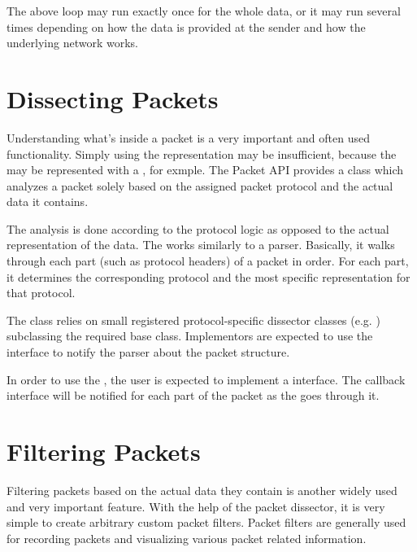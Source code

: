 
The above loop may run exactly once for the whole data, or it may run several
times depending on how the data is provided at the sender and how the underlying
network works.

\section{Dissecting Packets}

Understanding what's inside a packet is a very important and often used
functionality. Simply using the representation may be insufficient, because the
 may be represented with a , for exmple.
The Packet API provides a  class which analyzes a
packet solely based on the assigned packet protocol and the actual data it
contains.

The analysis is done according to the protocol logic as opposed to the actual
representation of the data. The  works similarly to a
parser. Basically, it walks through each part (such as protocol headers) of a
packet in order. For each part, it determines the corresponding protocol and the
most specific representation for that protocol.

The  class relies on small registered
protocol-specific dissector classes (e.g. )
subclassing the required  base class. Implementors
are expected to use the  interface to
notify the parser about the packet structure.


In order to use the , the user is expected to
implement a   interface. The callback
interface will be notified for each part of the packet as the
 goes through it.


\section{Filtering Packets}

Filtering packets based on the actual data they contain is another widely used
and very important feature. With the help of the packet dissector, it is very
simple to create arbitrary custom packet filters. Packet filters are generally
used for recording packets and visualizing various packet related information.

